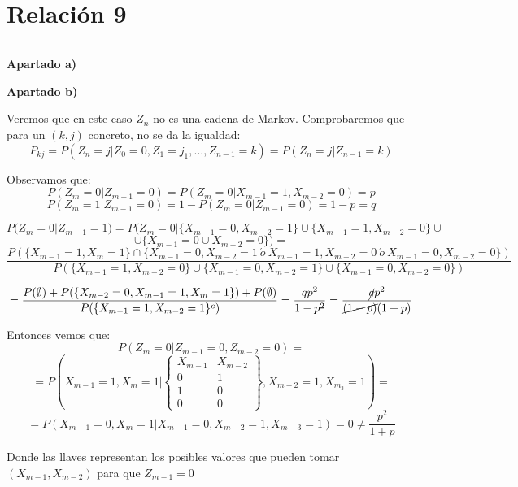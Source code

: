 \documentclass[openany]{book}
\begin{document}
\chapter{Relación 9}

\begin{exercise}
    $  $
    \begin{flushright}
        \textbf{Apartado a)}
    \end{flushright}

    \begin{flushright}
        \textbf{Apartado b)}
    \end{flushright}
    
    Veremos que en este caso $ Z_n $ no es una cadena de Markov. Comprobaremos que para un $ (k,j)  $ concreto, no se da la igualdad:
    $$ P_{kj} = P(Z_n = j|Z_0 = 0,Z_1=j_1,...,Z_{n-1} = k) = P(Z_n=j|Z_{n-1} = k) $$

    Observamos que:
    $$ P(Z_m = 0 |Z_{m-1} = 0) = P(Z_m = 0| X_{m-1} = 1,X_{m-2} = 0) = p $$
    $$ P(Z_m = 1 | Z_{m-1} = 0) = 1-P(Z_m = 0 |Z_{m-1} = 0) = 1-p = q $$

    $$ P(Z_m = 0|Z_{m-1} = 1) = P(Z_m = 0|\{X_{m-1} = 0,X_{m-2} = 1\} \cup \{X_{m-1} = 1,X_{m-2} = 0\}\cup $$  
    $$\cup \{X_{m-1}=0\cup X_{m-2} = 0\}) = $$  
    $$\dfrac{P(\{X_{m-1} = 1,X_m = 1\}\cap \{X_{m-1} = 0,X_{m-2} = 1\ \acute o\ X_{m-1} = 1,X_{m-2} = 0\ \acute o\ X_{m-1} = 0,X_{m-2} = 0\})}{P(\{X_{m-1}=1,X_{m-2}=0\}\cup\{X_{m-1}=0,X_{m-2}=1\}\cup \{X_{m-1}=0,X_{m-2}=0\})} $$

    $$ = \dfrac{P(\emptyset)+P(\{X_{m-2}=0,X_{m-1}=1,X_{m}=1\}) + P(\emptyset)}{P(\{X_{m-1} = 1,X_{m-2} =1\}^{c})} = \dfrac{qp^2}{1-p^2} = \dfrac{\cancel{q}p^2}{\cancel{(1-p)}(1+p)}$$
    
    Entonces vemos que:
    $$ P(Z_m = 0|Z_{m-1} = 0,Z_{m-2} = 0) = $$  
    $$=  P\left(X_{m-1}=1,X_m = 1 \Biggr| \left\{
    \begin{array}{cc}
        X_{m-1} & X_{m-2}\\0 & 1\\ 1 & 0 \\ 0 & 0
    \end{array}
    \right\},X_{m-2} = 1,X_{m_3} = 1\right) =$$ 
    $$=P(X_{m-1} = 0,X_{m}=1|X_{m-1} = 0,X_{m-2} = 1,X_{m-3} = 1) = 0 \ne \dfrac{p^2}{1+p} $$

    Donde las llaves representan los posibles valores que pueden tomar $ (X_{m-1},X_{m-2}) $ para que $ Z_{m-1} = 0 $

    
\end{exercise}
\end{document}
